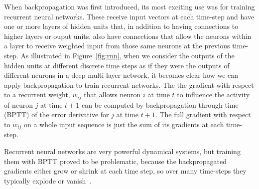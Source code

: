 \documentclass[10pts]{article}
\begin{document}

When backpropagation was first introduced, its most exciting use was
for training recurrent neural networks. These receive input vectors at
each time-step and have one or more layers of hidden units that, in
addition to having connections to higher layers or ouput units, also
have connections that allow the neurons within a layer to receive
weighted input from those same neurons at the previous time-step.  As
illustrated in Figure~\ref{fig:rnn}, when we consider the outputs of
the hidden units at different discrete time steps as if they were the
outputs of different neurons in a deep multi-layer network, it becomes
clear how we can apply backpropagation to train recurrent
networks. The the gradient with respect to a recurrent weight,
$w_{ij}$ that allows neuron $i$ at time $t$ to influence the activity
of neuron $j$ at time $t+1$ can be computed by
backpropagation-through-time (BPTT) of the error derivative for $j$ at
time $t+1$. The full gradient with respect to $w_{ij}$ on a whole
input sequence is just the sum of its gradients at each time-step.

Recurrent neural networks are very powerful dynamical systems, but
training them with BPTT proved to be problematic, because the
backpropagated gradients either grow or shrink at each time step, so
over many time-steps they typically explode or
vanish~\citep{Hochreiter91-small,Bengio-et-al-TNN1994}.
\end{document}
